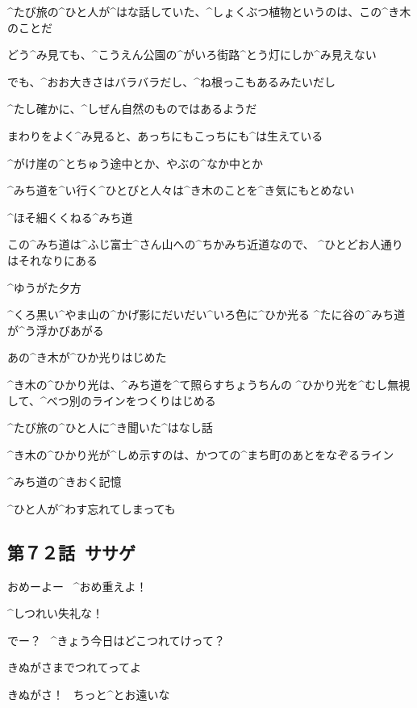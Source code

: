 \Alpha ^{たび}{旅}の^{ひと}{人}が^{はな}{話}していた、^{しょくぶつ}{植物}というのは、この^{き}{木}のことだ

\page
\Alpha どう^{み}{見}ても、^{こうえん}{公園}の^{がいろ}{街路}^{とう}{灯}にしか^{み}{見}えない

\Alpha でも、^{おお}{大}きさはバラバラだし、^{ね}{根}っこもあるみたいだし

\Alpha ^{たし}{確}かに、^{しぜん}{自然}のものではあるようだ

\page
\Alpha まわりをよく^{み}{見}ると、あっちにもこっちにも^{は}{生}えている

\Alpha ^{がけ}{崖}の^{とちゅう}{途中}とか、やぶの^{なか}{中}とか

\Alpha ^{みち}{道}を^{い}{行}く^{ひとびと}{人々}は^{き}{木}のことを^{き}{気}にもとめない

\Alpha ^{ほそ}{細}くくねる^{みち}{道}

\Alpha この^{みち}{道}は^{ふじ}{富士}^{さん}{山}への^{ちかみち}{近道}なので、
^{ひとどお}{人通}りはそれなりにある

\page[85]
\Alpha ^{ゆうがた}{夕方}

\Alpha ^{くろ}{黒}い^{やま}{山}の^{かげ}{影}にだいだい^{いろ}{色}に^{ひか}{光}る
^{たに}{谷}の^{みち}{道}が^{う}{浮}かびあがる

\page
\Alpha あの^{き}{木}が^{ひか}{光}りはじめた

\page
\Alpha ^{き}{木}の^{ひかり}{光}は、^{みち}{道}を^{て}{照}らすちょうちんの
^{ひかり}{光}を^{むし}{無視}して、^{べつ}{別}のラインをつくりはじめる

\Alpha ^{たび}{旅}の^{ひと}{人}に^{き}{聞}いた^{はなし}{話}

\page
\Alpha ^{き}{木}の^{ひかり}{光}が^{しめ}{示}すのは、かつての^{まち}{町}のあとをなぞるライン

\Alpha ^{みち}{道}の^{きおく}{記憶}

\Alpha ^{ひと}{人}が^{わす}{忘}れてしまっても


\subsection{第７２話\ ササゲ}

\page[95]
\Takahiro おめーよー
\ ^{おめ}{重}えよ！

\Makki ^{しつれい}{失礼}な！

\Takahiro でー？
\ ^{きょう}{今日}はどこつれてけって？

\Makki きぬがさまでつれてってよ

\Takahiro きぬがさ！
\ ちっと^{とお}{遠}いな

